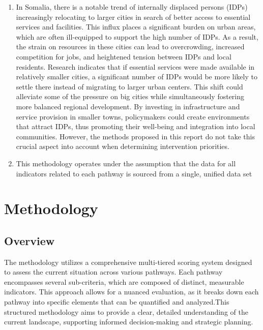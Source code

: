 \documentclass[
]{report}
\begin{document}
\begin{enumerate}
\def\labelenumi{\arabic{enumi}.}
\item
  In Somalia, there is a notable trend of internally displaced persons
  (IDPs) increasingly relocating to larger cities in search of better
  access to essential services and facilities. This influx places a
  significant burden on urban areas, which are often ill-equipped to
  support the high number of IDPs. As a result, the strain on resources
  in these cities can lead to overcrowding, increased competition for
  jobs, and heightened tension between IDPs and local residents.
  Research indicates that if essential services were made available in
  relatively smaller cities, a significant number of IDPs would be more
  likely to settle there instead of migrating to larger urban centers.
  This shift could alleviate some of the pressure on big cities while
  simultaneously fostering more balanced regional development. By
  investing in infrastructure and service provision in smaller towns,
  policymakers could create environments that attract IDPs, thus
  promoting their well-being and integration into local communities.
  However, the methods proposed in this report do not take this crucial
  aspect into account when determining intervention priorities.
\item
  This methodology operates under the assumption that the data for all
  indicators related to each pathway is sourced from a single, unified
  data set
\end{enumerate}

\chapter{Methodology}\label{methodology}

\section{Overview}\label{overview}

The methodology utilizes a comprehensive multi-tiered scoring system
designed to assess the current situation across various pathways. Each
pathway encompasses several sub-criteria, which are composed of
distinct, measurable indicators. This approach allows for a nuanced
evaluation, as it breaks down each pathway into specific elements that
can be quantified and analyzed.This structured methodology aims to
provide a clear, detailed understanding of the current landscape,
supporting informed decision-making and strategic planning.
\end{document}
